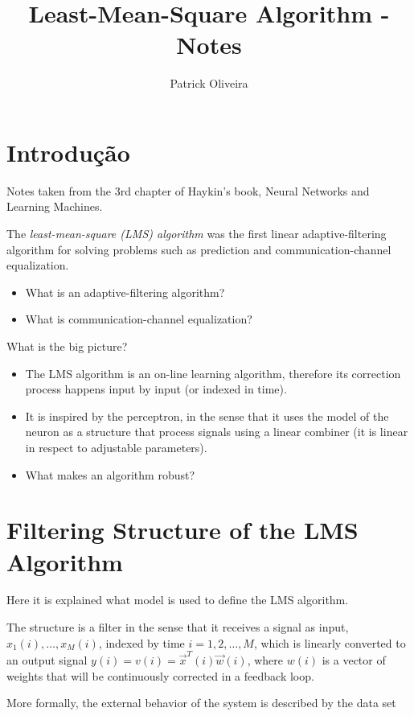 \documentclass[twocolumn]{article}
\title{Least-Mean-Square Algorithm - Notes}
\author{Patrick Oliveira}
\affil{}
\begin{document}
\maketitle

\section{Introdução}
Notes taken from the 3rd chapter of Haykin's book, Neural Networks and Learning Machines.

The \textit{least-mean-square (LMS) algorithm} was the first linear adaptive-filtering algorithm for solving problems such as prediction and communication-channel equalization. 

\begin{itemize}
	\item What is an adaptive-filtering algorithm?
	\item What is communication-channel equalization?
\end{itemize}

What is the big picture?

\begin{itemize}
	\item The LMS algorithm is an on-line learning algorithm, therefore its correction process happens input by input (or indexed in time).
	\item It is inspired by the perceptron, in the sense that it uses the model of the neuron as a structure that process signals using a linear combiner (it is linear in respect to adjustable parameters).
	\item What makes an algorithm robust?
	
\end{itemize}

\section{Filtering Structure of the LMS Algorithm}

Here it is explained what model is used to define the LMS algorithm.


The structure is a filter in the sense that it receives a signal as input, $x_{1} (i), \ldots, x_{M} (i)$, indexed by time $ i = 1, 2, \ldots, M $, which is linearly converted to an output signal $ y (i) = v (i) = \vec{x}^{T} (i) \vec{w} (i) $, where $ w (i) $ is a vector of weights that will be continuously corrected in a feedback loop.

More formally, the external behavior of the system is described by the data set
\end{document}
